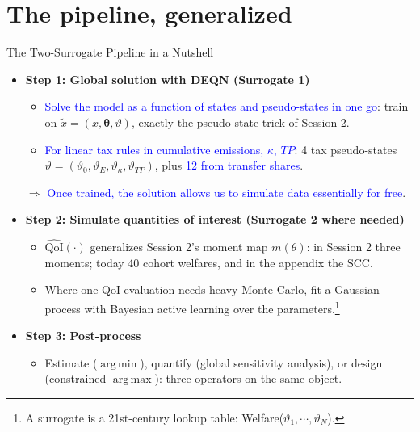 \documentclass[10pt,aspectratio=169]{beamer}
\DeclareMathOperator*{\argmin}{arg\,min}
\DeclareMathOperator*{\argmax}{arg\,max}
\begin{document}
\section{The pipeline, generalized}

\begin{frame}{The Two-Surrogate Pipeline in a Nutshell}
\small
  \begin{itemize}
    \item \textbf{Step 1: Global solution with DEQN (Surrogate 1)}
      \begin{itemize}
        \item \textcolor{blue}{Solve the model as a function of states and pseudo-states in one go}: train on $\tilde{x} = (x, \bm{\theta}, \vartheta)$, exactly the pseudo-state trick of Session 2.
        \item \textcolor{blue}{For linear tax rules in cumulative emissions, $\kappa$, $TP$}: 4 tax pseudo-states $\vartheta = (\vartheta_0, \vartheta_E, \vartheta_\kappa , \vartheta_{TP})$, plus \textcolor{blue}{12 from transfer shares}.
      \end{itemize}
      $\Rightarrow$ \textcolor{blue}{Once trained, the solution allows us to simulate data essentially for free}.
    \item \textbf{Step 2: Simulate quantities of interest (Surrogate 2 where needed)}
      \begin{itemize}
        \item $\widehat{\mathrm{QoI}}(\cdot)$ generalizes Session 2's moment map $m(\theta)$: in Session 2 three moments; today 40 cohort welfares, and in the appendix the SCC.
        \item Where one QoI evaluation needs heavy Monte Carlo, fit a Gaussian process with Bayesian active learning over the parameters.\footnote{A surrogate is a 21st-century lookup table: Welfare($\vartheta_1,\cdots,\vartheta_N$).}
      \end{itemize}
    \item \textbf{Step 3: Post-process}
      \begin{itemize}
        \item Estimate ($\argmin$), quantify (global sensitivity analysis), or design (constrained $\argmax$): three operators on the same object.
      \end{itemize}
  \end{itemize}
\end{frame}
\end{document}

